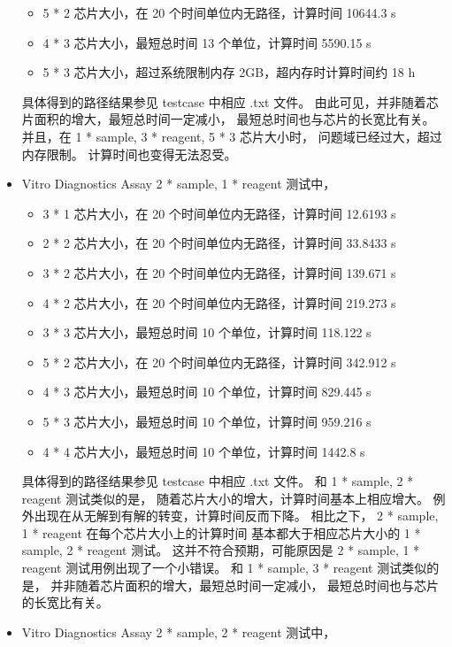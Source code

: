\documentclass[UTF8, a4paper, titlepage]{ctexart}
\begin{document}
\begin{itemize}
\begin{itemize}
		      \item 5 * 2 芯片大小，在 20 个时间单位内无路径，计算时间 10644.3 s
		      \item 4 * 3 芯片大小，最短总时间 13 个单位，计算时间 5590.15 s
		      \item 5 * 3 芯片大小，超过系统限制内存 2GB，超内存时计算时间约 18 h
	      \end{itemize}
	      具体得到的路径结果参见 testcase 中相应 .txt 文件。%
	      由此可见，并非随着芯片面积的增大，最短总时间一定减小，%
	      最短总时间也与芯片的长宽比有关。%
	      并且，在 1 * sample, 3 * reagent, 5 * 3 芯片大小时，%
	      问题域已经过大，超过内存限制。%
	      计算时间也变得无法忍受。%
	\item Vitro Diagnostics Assay 2 * sample, 1 * reagent 测试中，%
	      \begin{itemize}
		      \item 3 * 1 芯片大小，在 20 个时间单位内无路径，计算时间 12.6193 s
		      \item 2 * 2 芯片大小，在 20 个时间单位内无路径，计算时间 33.8433 s
		      \item 3 * 2 芯片大小，在 20 个时间单位内无路径，计算时间 139.671 s
		      \item 4 * 2 芯片大小，在 20 个时间单位内无路径，计算时间 219.273 s
		      \item 3 * 3 芯片大小，最短总时间 10 个单位，计算时间 118.122 s
		      \item 5 * 2 芯片大小，在 20 个时间单位内无路径，计算时间 342.912 s
		      \item 4 * 3 芯片大小，最短总时间 10 个单位，计算时间 829.445 s
		      \item 5 * 3 芯片大小，最短总时间 10 个单位，计算时间  959.216 s
		      \item 4 * 4 芯片大小，最短总时间 10 个单位，计算时间 1442.8 s
	      \end{itemize}
	      具体得到的路径结果参见 testcase 中相应 .txt 文件。%
	      和 1 * sample, 2 * reagent 测试类似的是，%
	      随着芯片大小的增大，计算时间基本上相应增大。%
	      例外出现在从无解到有解的转变，计算时间反而下降。%
	      相比之下， 2 * sample, 1 * reagent 在每个芯片大小上的计算时间%
	      基本都大于相应芯片大小的 1 * sample, 2 * reagent 测试。%
	      这并不符合预期，可能原因是 2 * sample, 1 * reagent 测试用例出现了一个小错误。%
	      和 1 * sample, 3 * reagent 测试类似的是，%
	      并非随着芯片面积的增大，最短总时间一定减小，%
	      最短总时间也与芯片的长宽比有关。%
	\item Vitro Diagnostics Assay 2 * sample, 2 * reagent 测试中，%

\end{itemize}
\end{document}
